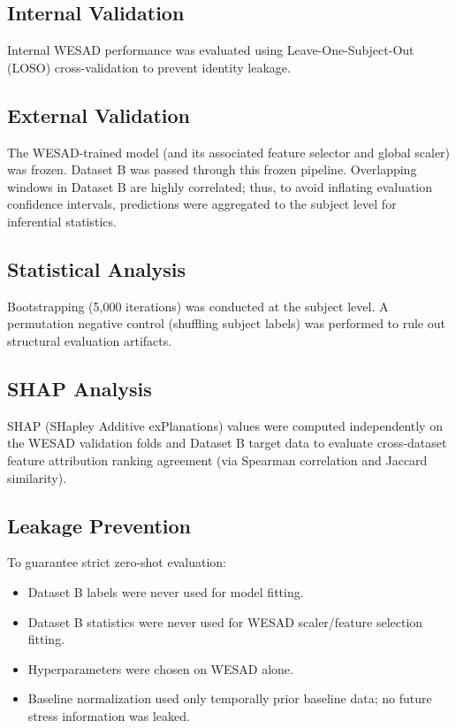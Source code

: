 \documentclass[journal]{IEEEtran}
\begin{document}
\subsection{Internal Validation}
Internal WESAD performance was evaluated using Leave-One-Subject-Out (LOSO) cross-validation to prevent identity leakage.

\subsection{External Validation}
The WESAD-trained model (and its associated feature selector and global scaler) was frozen. Dataset B was passed through this frozen pipeline. Overlapping windows in Dataset B are highly correlated; thus, to avoid inflating evaluation confidence intervals, predictions were aggregated to the subject level for inferential statistics.

\subsection{Statistical Analysis}
Bootstrapping (5,000 iterations) was conducted at the subject level. A permutation negative control (shuffling subject labels) was performed to rule out structural evaluation artifacts. 

\subsection{SHAP Analysis}
SHAP (SHapley Additive exPlanations) values were computed independently on the WESAD validation folds and Dataset B target data to evaluate cross-dataset feature attribution ranking agreement (via Spearman correlation and Jaccard similarity).

\subsection{Leakage Prevention}
To guarantee strict zero-shot evaluation:
\begin{itemize}
    \item Dataset B labels were never used for model fitting.
    \item Dataset B statistics were never used for WESAD scaler/feature selection fitting.
    \item Hyperparameters were chosen on WESAD alone.
    \item Baseline normalization used only temporally prior baseline data; no future stress information was leaked.
\end{itemize}
\end{document}
